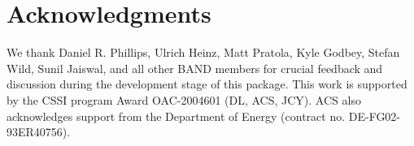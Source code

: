 \documentclass[10pt, preprint,aps,prc,floatfix,
tightenlines,
nofootinbib,superscriptaddress]{revtex4-2}
\begin{document}
\section{Acknowledgments}

We thank Daniel R. Phillips, Ulrich Heinz, Matt Pratola, Kyle Godbey, Stefan Wild, Sunil Jaiswal, and all other BAND members for crucial feedback and discussion during the development stage of this package. This work is supported by the CSSI program Award OAC-2004601 (DL, ACS, JCY). ACS also acknowledges support from the Department of Energy (contract no. DE-FG02-93ER40756).

\end{document}
